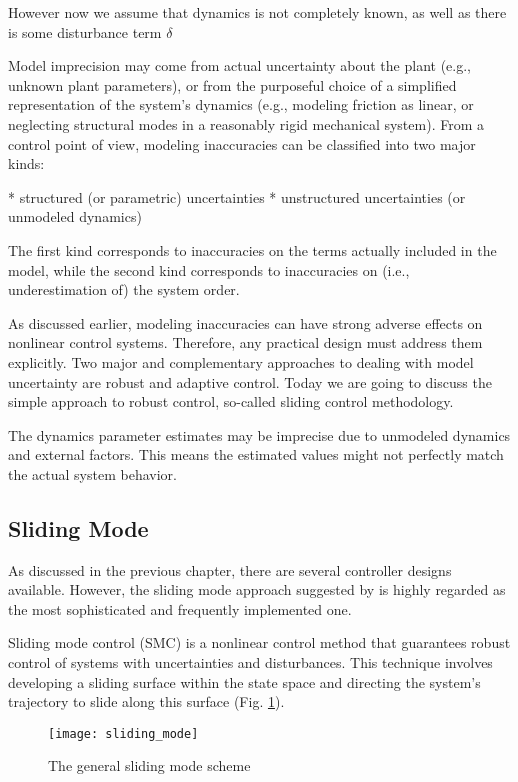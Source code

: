 However now we assume that dynamics is not completely known,
as well as there is some disturbance term $\delta$

Model imprecision may come from actual uncertainty about the plant (e.g., unknown plant
parameters), or from the purposeful choice of a simplified representation of the
system's dynamics (e.g., modeling friction as linear, or neglecting structural modes in
a reasonably rigid mechanical system). From a control point of view, modeling
inaccuracies can be classified into two major kinds:

* structured (or parametric) uncertainties
* unstructured uncertainties (or unmodeled dynamics)

The first kind corresponds to inaccuracies on the terms actually included in the model,
while the second kind corresponds to inaccuracies on (i.e., underestimation of) the
system order.

As discussed earlier, modeling inaccuracies can have strong adverse effects on
nonlinear control systems. Therefore, any practical design must address them
explicitly. Two major and complementary approaches to dealing with model uncertainty are robust and adaptive control. Today we are going to discuss the simple approach to robust control,
so-called sliding control methodology.

The dynamics parameter estimates may be imprecise due to unmodeled dynamics and external
factors. This means the estimated values might not perfectly match the actual system behavior.


\subsection{Sliding Mode}

As discussed in the previous chapter, there are several controller
designs available. However, the sliding mode approach suggested by 
is highly regarded as the most sophisticated and frequently implemented one.

Sliding mode control (SMC) is a nonlinear control method that guarantees
robust control of systems with uncertainties and disturbances.
This technique involves developing a sliding surface within the state
space and directing the system's trajectory to slide along this surface (Fig. \ref{image:sliding_mode}).

\begin{figure}[H]
    \centering\texttt{[image: sliding\_mode]}
    \caption{The general sliding mode scheme}
    \label{image:sliding_mode}
\end{figure}

